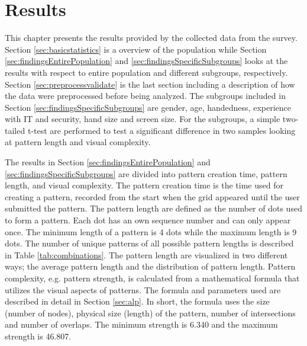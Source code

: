 \chapter{Results}\label{chap:results}

	This chapter presents the results provided by the collected data from the survey. Section \ref{sec:basicstatistics} is a overview of the population while Section \ref{sec:findingsEntirePopulation} and \ref{sec:findingsSpecificSubgroups} looks at the results with respect to entire population and different subgroups, respectively. Section \ref{sec:preprocessvalidate} is the last section including a description of how the data were preprocessed before being analyzed. The subgroups included in Section \ref{sec:findingsSpecificSubgroups} are gender, age, handedness, experience with IT and security, hand size and screen size. For the subgroups, a simple two-tailed t-test are performed to test a significant difference in two samples looking at pattern length and visual complexity. 

	The results in Section \ref{sec:findingsEntirePopulation} and \ref{sec:findingsSpecificSubgroups} are divided into pattern creation time, pattern length, and visual complexity. The pattern creation time is the time used for creating a pattern, recorded from the start when the grid appeared until the user submitted the pattern. The pattern length are defined as the number of dots used to form a pattern. Each dot has an own sequence number and can only appear once. The minimum length of a pattern is 4 dots while the maximum length is 9 dots. The number of unique patterns of all possible pattern lengths is described in Table \ref{tab:combinations}. The pattern length are visualized in two different ways; the average pattern length and the distribution of pattern length. Pattern complexity, e.g. pattern strength, is calculated from a mathematical formula that utilizes the visual aspects of patterns. The formula and parameters used are described in detail in Section \ref{sec:alp}. In short, the formula uses the size (number of nodes), physical size (length) of the pattern, number of intersections and number of overlaps. The minimum strength is 6.340 and the maximum strength is 46.807.
